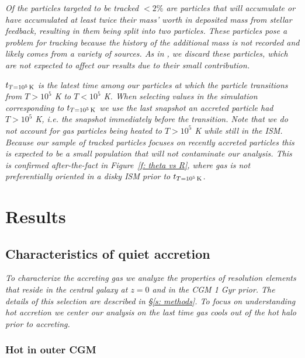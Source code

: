 \documentclass[fleqn,usenatbib]{mnras}
\newcommand{\tcon}{t_{T=10^5\,{\rm K}}}
\begin{document}
\textit{
Of the particles targeted to be tracked $<2\%$ are particles that will accumulate or have accumulated at least twice their mass' worth in deposited mass from stellar feedback, resulting in them being split into two particles.
These particles pose a problem for tracking because the history of the additional mass is not recorded and likely comes from a variety of sources.
As in \cite{Hafen2019}, we discard these particles, which are not expected to affect our results due to their small contribution.
}

\textit{
$\tcon$ is the latest time among our particles at which the particle transitions from $T > 10^5$ K to $T< 10^5$ K.
When selecting values in the simulation corresponding to $\tcon$ we use the last snapshot an accreted particle had $T > 10^5$ K, i.e. the snapshot immediately before the transition.
Note that we do not account for gas particles being heated to $T > 10^5$ K while still in the ISM.
Because our sample of tracked particles focuses on recently accreted particles this is expected to be a small population that will not contaminate our analysis.
This is confirmed after-the-fact in Figure~\ref{f: theta vs R}, where gas is not preferentially oriented in a disky ISM prior to $\tcon$.
}

\section{Results}
\label{s: results}


\subsection{Characteristics of quiet accretion}
\label{s: characteristics}

\textit{
To characterize the accreting gas we analyze the properties of resolution elements that reside in the central galaxy at $z=0$ and in the CGM 1 Gyr prior.
The details of this selection are described in \S\ref{s: methods}.
To focus on understanding hot accretion we center our analysis on the last time gas cools out of the hot halo prior to accreting.
}


\subsubsection{Hot in outer CGM}
\label{s: inflowing gas phase}
\end{document}
